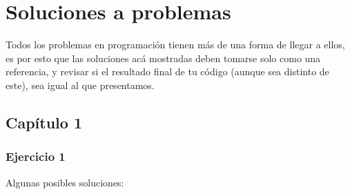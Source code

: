 \documentclass[]{book}
\newenvironment{Shaded}{\begin{snugshade}}{\end{snugshade}}
\newcommand{\KeywordTok}[1]{\textcolor[rgb]{0.13,0.29,0.53}{\textbf{#1}}}
\newcommand{\NormalTok}[1]{#1}
\newcommand{\OperatorTok}[1]{\textcolor[rgb]{0.81,0.36,0.00}{\textbf{#1}}}
\newcommand{\StringTok}[1]{\textcolor[rgb]{0.31,0.60,0.02}{#1}}
\begin{document}
\hypertarget{soluciones}{%
\chapter{Soluciones a problemas}\label{soluciones}}

Todos los problemas en programación tienen más de una forma de llegar a
ellos, es por esto que las soluciones acá mostradas deben tomarse solo
como una referencia, y revisar si el resultado final de tu código
(aunque sea distinto de este), sea igual al que presentamos.

\hypertarget{capitulo-1}{%
\section{Capítulo 1}\label{capitulo-1}}

\hypertarget{ejercicio-1-3}{%
\subsection{Ejercicio 1}\label{ejercicio-1-3}}

Algunas posibles soluciones:

\begin{Shaded}
\end{Shaded}

\begin{Shaded}
\end{Shaded}
\end{document}
